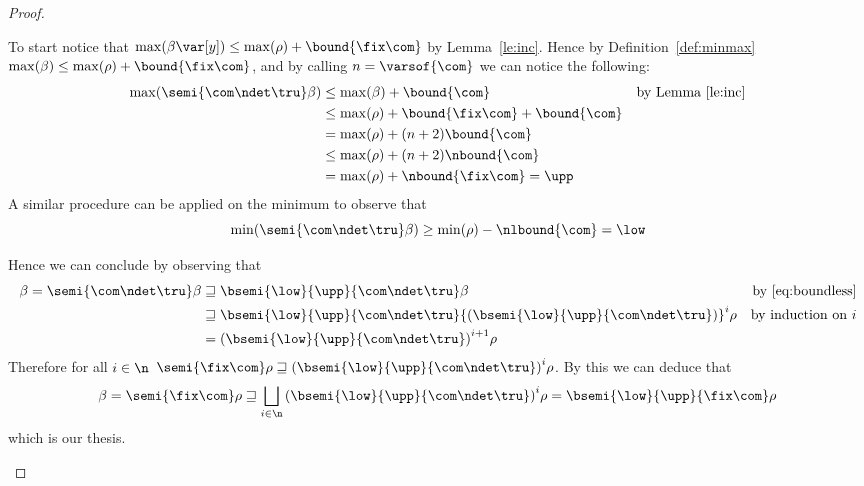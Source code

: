 \begin{proof}
\begin{inductive}
\begin{description}
      To start notice that
      \(\max(\beta\var[y]) \leq \max(\rho) + \bound{\fix\com}\) by
      Lemma~\ref{le:inc}. Hence by Definition~\ref{def:minmax}
      \(\max(\beta) \leq \max(\rho) + \bound{\fix\com}\), and by
      calling \(n = \varsof{\com}\) we can notice the following:
      \begin{align*}
        \max(\semi{\com\ndet\tru}\beta) & \leq \max(\beta) + \bound{\com} & \text{by Lemma~\ref{le:inc}}\\
                                               & \leq \max(\rho) + \bound{\fix\com} + \bound{\com} \\
                                               & = \max(\rho) + (n+2)\bound{\com} \\
                                               & \leq \max(\rho) + (n+2)\nbound{\com} \\
                                               & = \max(\rho) + \nbound{\fix\com} = \upp
      \end{align*}
      A similar procedure can be applied on the minimum to observe
      that
      \[\min(\semi{\com\ndet\tru}\beta) \geq \min(\rho) -
        \nlbound{\com}= \low\]

      Hence we can conclude by observing that
      \begin{align*}
        \beta = \semi{\com\ndet\tru}\beta & \sqsupseteq \bsemi{\low}{\upp}{\com\ndet\tru}\beta  & \text{by~\eqref{eq:boundless}}\\
                                                 & \sqsupseteq \bsemi{\low}{\upp}{\com\ndet\tru}{\left(\bsemi{\low}{\upp}{\com\ndet\tru}\right)}^i\rho & \text{by induction on } i \\
        & = {\left(\bsemi{\low}{\upp}{\com\ndet\tru}\right)}^{i+1}\rho
      \end{align*}
      Therefore for all \(i\in\n\)
      \(\semi{\fix\com}\rho \sqsupseteq
      {\left(\bsemi{\low}{\upp}{\com\ndet\tru}\right)}^{i}\rho\). By
      this we can deduce that
      \begin{equation*}
        \beta = \semi{\fix\com}\rho \sqsupseteq \bigsqcup_{i\in\n}{\left(\bsemi{\low}{\upp}{\com\ndet\tru}\right)}^i\rho = \bsemi{\low}{\upp}{\fix\com}\rho
      \end{equation*}
      which is our thesis.
    \end{description}
  \end{inductive}
\end{proof}


